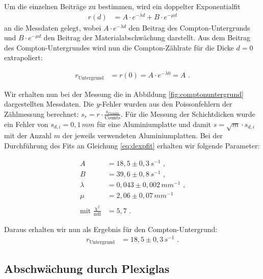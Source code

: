 Um die einzelnen Beiträge zu bestimmen, wird ein doppelter Exponentialfit
\begin{align}
	r(d)&=A\cdot e^{-\lambda d}+B\cdot e^{-\mu d}
\end{align}
an die Messdaten gelegt, wobei $A\cdot e^{-\lambda d}$ den Beitrag des Compton-Untergrunds und $B\cdot e^{-\mu d}$ den Beitrag der Materialabschwächung darstellt. Aus dem Beitrag des Compton-Untergrundes wird nun die Compton-Zählrate für die Dicke $d=0$ extrapoliert:

\begin{align}
	r_\text{Untergrund}&=r(0)=A\cdot e^{-\lambda 0}=A\text{ .}\label{eq:dexpfit}
\end{align}


Wir erhalten nun bei der Messung die in Abbildung \ref{fig:comptonuntergrund} dargestellten Messdaten. Die $y$-Fehler wurden aus den Poissonfehlern der Zählmessung berechnet: $s_r=r\cdot\frac{s_\text{Counts}}{\mathrm{Counts}}$. Für die Messung der Schichtdicken wurde ein Fehler von $s_{d,i}=0,1\,\si{mm}$ für eine Aluminiumplatte und damit $s=\sqrt{m}\cdot s_{d,i}$ mit der Anzahl $m$ der jeweils verwendeten Aluminiumplatten. Bei der Durchführung des Fits an Gleichung \ref{eq:dexpfit} erhalten wir folgende Parameter:

\begin{align*}
		A&=18,5\pm0,3\,\si{s^{-1}}\text{ ,}\\
		B&=39,6\pm0,8\,\si{s^{-1}}\text{ ,}\\
		\lambda&=0,043\pm0,002\,\si{mm^{-1}}\text{ ,}\\
		\mu&=2,06\pm0,07\,\si{mm^{-1}}\\
		\ \\
		\text{mit }\frac{\chi^2}{\mathrm{ndf}}&=5,7\text{ .}
\end{align*}

Daraus erhalten wir nun als Ergebnis für den Compton-Untergrund:
\begin{align}
	r_\text{Untergrund}&=18,5\pm0,3\,\si{s^{-1}}\text{ .}
\end{align}

\subsection{Abschwächung durch Plexiglas}

